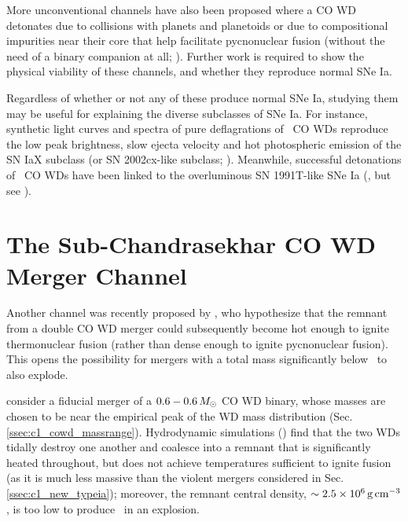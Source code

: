 More unconventional channels have also been proposed where a CO WD detonates due to collisions with planets and planetoids \citep{distfg15} or due to compositional impurities near their core that help facilitate pycnonuclear fusion (without the need of a binary companion at all; \citealt{chio+15}).  Further work is required to show the physical viability of these channels, and whether they reproduce normal SNe Ia.  

Regardless of whether or not any of these produce normal SNe Ia, studying them may be useful for explaining the diverse subclasses of SNe Ia.  For instance, synthetic light curves and spectra of pure deflagrations of \Mch\ CO WDs \citep{phil+07, krom+13, fink+14} reproduce the low peak brightness, slow ejecta velocity and hot photospheric emission of the SN IaX subclass (or SN 2002cx-like subclass; \citealt{li+02, fole+13}).  Meanwhile, successful detonations of \Mch\ CO WDs have been linked to the overluminous SN 1991T-like SNe Ia (\citealt{fishj15}, but see \citealt{seit+16}).


\section{The Sub-Chandrasekhar CO WD Merger Channel}
\label{sec:c1_vkchannel}

Another channel was recently proposed by \citeal{vkercj10}, who hypothesize that the remnant from a double CO WD merger could subsequently become hot enough to ignite thermonuclear fusion (rather than dense enough to ignite pycnonuclear fusion).  This opens the possibility for mergers with a total mass significantly below \Mch\ to also explode.

\citeal{vkercj10} consider a fiducial merger of a $0.6-0.6\,\Msun$ CO WD binary, whose masses are chosen to be near the empirical peak of the WD mass distribution (Sec. \ref{ssec:c1_cowd_massrange}).  Hydrodynamic simulations (\citeal{loreig09}) find that the two WDs tidally destroy one another and coalesce into a remnant that is significantly heated throughout, but does not achieve temperatures sufficient to ignite fusion (as it is much less massive than the violent mergers considered in Sec. \ref{ssec:c1_new_typeia}); moreover, the remnant central density, $\sim2.5\times10^6\,\gcc$, is too low to produce \Ni\ in an explosion.  


